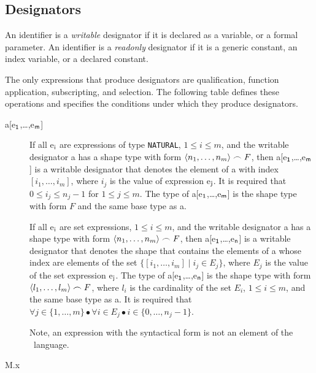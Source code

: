\subsection*{Designators}

An identifier is a {\em writable} designator if it is declared as a
variable, or a formal parameter.  An identifier is a {\em readonly}
designator if it is a generic constant, an index variable, or a
declared constant.

The only expressions that produce designators are qualification,
function application, subscripting, and selection. The following table
defines these operations and specifies the conditions under which they
produce designators.

\begin{description}

\item[{\sf a[e$_{\sf 1}$,\ldots,e$_{\sf m}$]}] 

If all {\sf e$_{\sf i}$} are expressions of type {\tt NATURAL}, $1
\leq i \leq m$, and the writable designator {\sf a} has a shape type
with form $\langle n_1,\ldots,n_m \rangle \frown F$, then {\sf
a[e$_{\sf 1}$,\ldots,e$_{\sf m}$]} is a writable designator that
denotes the element of {\sf a} with index $[i_1,\ldots,i_m]$, where
$i_j$ is the value of expression {\sf e$_{\sf j}$}. It is required
that $0 \leq i_j \leq n_j-1$ for $ 1 \leq j \leq m$. The type of {\sf
a[e$_{\sf 1}$,\ldots,e$_{\sf m}$]} is the shape type with form $F$ and
the same base type as {\sf a}.

If all {\sf e$_{\sf i}$} are set expressions, $1 \leq i \leq m$, and
the writable designator {\sf a} has a shape type with form $\langle
n_1,\ldots,n_m \rangle \frown F$, then {\sf a[e$_{\sf
1}$,\ldots,e$_{\sf n}$]} is a writable designator that denotes the
shape that contains the elements of {\sf a} whose index are elements
of the set $\{[i_1,\ldots,i_m] \mid i_j \in E_j\}$, where $E_j$ is the
value of the set expression {\sf e$_{\sf j}$}. The type of {\sf
a[e$_{\sf 1}$,\ldots,e$_{\sf n}$]} is the shape type with form
$\langle l_1,\ldots,l_m\rangle \frown F$, where $l_i$ is the
cardinality of the set $E_i$, $1 \leq i \leq m$, and the same base
type as {\sf a}. It is required that $\forall j \in \{1,\ldots,m\}
\bullet \forall i \in E_j \bullet i \in \{0,\ldots,n_j-1\}$.

Note, an expression with the syntactical form 
is not an element of the \Booster\ language.


\item[{\sf M.x}]


\end{description}
